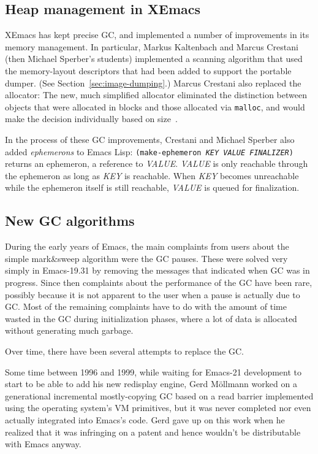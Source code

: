 \documentclass[format=acmsmall, review]{acmart}
\newcommand \Elisp {Emacs Lisp}
\newcommand \id[1] {\textrm{\textsl{#1}}}
\begin{document}
\subsection{Heap management in XEmacs}
\label{sec:heap-xemacs}

XEmacs has kept precise GC, and implemented a number of improvements
in its memory management.  In particular, Markus Kaltenbach and Marcus
Crestani (then Michael Sperber's students)
implemented a scanning algorithm that used the memory-layout
descriptors that had been added to support the portable dumper.  (See
Section~\ref{sec:image-dumping}.)  Marcus Crestani also replaced the
allocator: The new, much simplified allocator eliminated the
distinction between objects that were allocated in blocks and those
allocated via \texttt{malloc}, and would make the decision
individually based on size~\cite{Crestani2005}.

In the process of these GC improvements, Crestani and Michael Sperber
also added \emph{ephemerons} to \Elisp{}: \texttt{(make-ephemeron
  \id{KEY} \id{VALUE} \id{FINALIZER})} returns an ephemeron, a reference
to \id{VALUE}.  \id{VALUE} is only reachable through the ephemeron as
long as \id{KEY} is reachable.  When \id{KEY} becomes unreachable while
the ephemeron itself is still reachable, \id{VALUE} is queued for
finalization.

\subsection{New GC algorithms}
\label{sec:gc-algorithms}

During the early years of Emacs, the main complaints from users about the
simple mark\&sweep algorithm were the GC pauses.  These were solved very
simply in Emacs-19.31 by removing the messages that indicated when GC was in
progress.  Since then complaints about the performance of the GC have been
rare, possibly because it is not apparent to the user when a pause is
actually due to GC.  Most of the remaining complaints have to do with
the amount of time wasted in the
GC during initialization phases, where a lot of data is allocated without
generating much garbage.

Over time, there have been several attempts to replace the GC.

Some time between 1996 and 1999, while waiting for Emacs-21 development to
start to be able to add his new redisplay engine, Gerd
Möllmann worked on a generational incremental mostly-copying GC based on
a read barrier implemented using the operating system's VM primitives, but
it was never completed nor even actually integrated into Emacs's code.
Gerd gave up on this work when he realized that it was infringing on
a patent and hence wouldn't be distributable with Emacs anyway.
\end{document}
